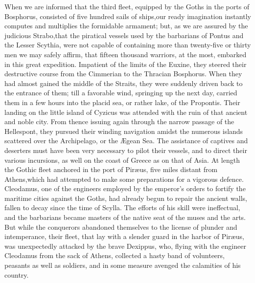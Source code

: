

When we are informed that the third fleet, equipped by the Goths
in the ports of Bosphorus, consisted of five hundred sails of
ships,\footnotemark[120] our ready imagination instantly computes and
multiplies the formidable armament; but, as we are assured by the
judicious Strabo,\footnotemark[121] that the piratical vessels used by the
barbarians of Pontus and the Lesser Scythia, were not capable of
containing more than twenty-five or thirty men we may safely
affirm, that fifteen thousand warriors, at the most, embarked in
this great expedition. Impatient of the limits of the Euxine,
they steered their destructive course from the Cimmerian to the
Thracian Bosphorus. When they had almost gained the middle of the
Straits, they were suddenly driven back to the entrance of them;
till a favorable wind, springing up the next day, carried them in
a few hours into the placid sea, or rather lake, of the
Propontis. Their landing on the little island of Cyzicus was
attended with the ruin of that ancient and noble city. From
thence issuing again through the narrow passage of the
Hellespont, they pursued their winding navigation amidst the
numerous islands scattered over the Archipelago, or the Ægean
Sea. The assistance of captives and deserters must have been very
necessary to pilot their vessels, and to direct their various
incursions, as well on the coast of Greece as on that of Asia. At
length the Gothic fleet anchored in the port of Piræus, five
miles distant from Athens,\footnotemark[122] which had attempted to make some
preparations for a vigorous defence. Cleodamus, one of the
engineers employed by the emperor’s orders to fortify the
maritime cities against the Goths, had already begun to repair
the ancient walls, fallen to decay since the time of Scylla. The
efforts of his skill were ineffectual, and the barbarians became
masters of the native seat of the muses and the arts. But while
the conquerors abandoned themselves to the license of plunder and
intemperance, their fleet, that lay with a slender guard in the
harbor of Piræus, was unexpectedly attacked by the brave
Dexippus, who, flying with the engineer Cleodamus from the sack
of Athens, collected a hasty band of volunteers, peasants as well
as soldiers, and in some measure avenged the calamities of his
country.\footnotemark[123]

